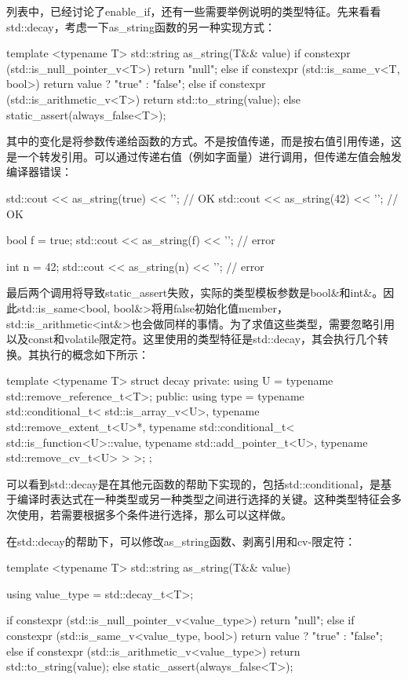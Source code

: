 列表中，已经讨论了enable\_if，还有一些需要举例说明的类型特征。先来看看std::decay，考虑一下as\_string函数的另一种实现方式：

\begin{cpp}
template <typename T>
std::string as_string(T&& value)
{
	if constexpr (std::is_null_pointer_v<T>)
		return "null";
	else if constexpr (std::is_same_v<T, bool>)
		return value ? "true" : "false";
	else if constexpr (std::is_arithmetic_v<T>)
		return std::to_string(value);
	else
		static_assert(always_false<T>);
}
\end{cpp}

其中的变化是将参数传递给函数的方式。不是按值传递，而是按右值引用传递，这是一个转发引用。可以通过传递右值（例如字面量）进行调用，但传递左值会触发编译器错误：

\begin{cpp}
std::cout << as_string(true) << '\n'; // OK
std::cout << as_string(42) << '\n'; // OK

bool f = true;
std::cout << as_string(f) << '\n'; // error

int n = 42;
std::cout << as_string(n) << '\n'; // error
\end{cpp}

最后两个调用将导致static\_assert失败，实际的类型模板参数是bool\&和int\&。因此std::is\_same<bool, bool\&>将用false初始化值member，std::is\_arithmetic<int\&>也会做同样的事情。为了求值这些类型，需要忽略引用以及const和volatile限定符。这里使用的类型特征是std::decay，其会执行几个转换。其执行的概念如下所示：

\begin{cpp}
template <typename T>
struct decay
{
private:
	using U = typename std::remove_reference_t<T>;
public:
	using type = typename std::conditional_t<
		std::is_array_v<U>,
		typename std::remove_extent_t<U>*,
		typename std::conditional_t<
			std::is_function<U>::value,
			typename std::add_pointer_t<U>,
			typename std::remove_cv_t<U>
		>
	>;
};
\end{cpp}

可以看到std::decay是在其他元函数的帮助下实现的，包括std::conditional，是基于编译时表达式在一种类型或另一种类型之间进行选择的关键。这种类型特征会多次使用，若需要根据多个条件进行选择，那么可以这样做。

在std::decay的帮助下，可以修改as\_string函数、剥离引用和cv-限定符：

\begin{cpp}
template <typename T>
std::string as_string(T&& value)
{
	using value_type = std::decay_t<T>;
	
	if constexpr (std::is_null_pointer_v<value_type>)
		return "null";
	else if constexpr (std::is_same_v<value_type, bool>)
		return value ? "true" : "false";
	else if constexpr (std::is_arithmetic_v<value_type>)
		return std::to_string(value);
	else
		static_assert(always_false<T>);
}
\end{cpp}

